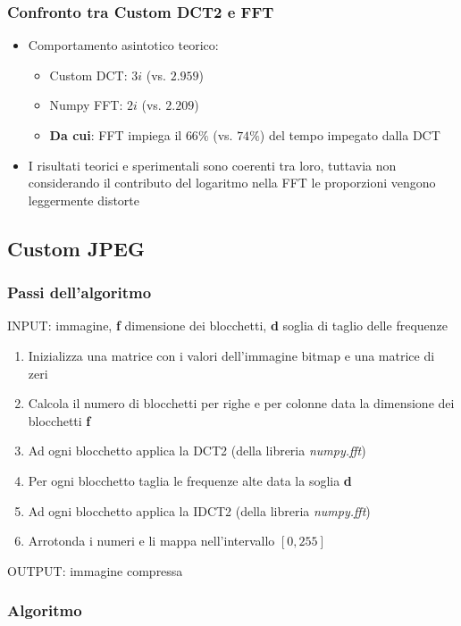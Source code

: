 \documentclass{beamer}
\begin{document}
\begin{frame}
	\frametitle{Confronto tra Custom DCT2 e FFT}
	\begin{itemize}
		\item Comportamento asintotico teorico:
		\begin{itemize}
			\item Custom DCT: $3i$ (vs. $2.959$)
			\item Numpy FFT: $2i$ (vs. $2.209$)
			\item \textbf{Da cui}: FFT impiega il $66\%$ (vs. $74\%$) del tempo impegato dalla DCT
		\end{itemize}
		\item I risultati teorici e sperimentali sono coerenti tra loro, tuttavia non considerando il contributo del logaritmo nella FFT le proporzioni vengono leggermente distorte
	\end{itemize}
\end{frame}

\subsection{Custom JPEG}

\begin{frame}
\frametitle{Passi dell'algoritmo}
\begin{small}
INPUT: immagine, \textbf{f} dimensione dei blocchetti, \textbf{d} soglia di taglio delle frequenze
\begin{enumerate}
\item Inizializza una matrice con i valori dell'immagine bitmap e una matrice di zeri
\item Calcola il numero di blocchetti per righe e per colonne data la dimensione dei blocchetti \textbf{f}
\item Ad ogni blocchetto applica la DCT2 (della libreria \textit{numpy.fft})
\item Per ogni blocchetto taglia le frequenze alte data la soglia \textbf{d}
\item Ad ogni blocchetto applica la IDCT2 (della libreria \textit{numpy.fft})
\item Arrotonda i numeri e li mappa nell'intervallo $[0, 255]$
\end{enumerate}

OUTPUT: immagine compressa
\end{small}
\end{frame}

\begin{frame}
\frametitle{Algoritmo}



\end{frame}
\end{document}
